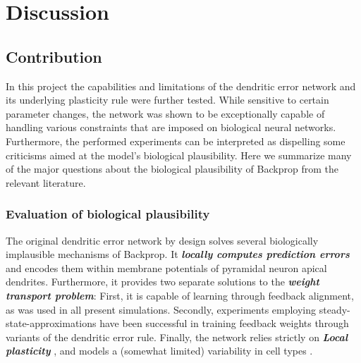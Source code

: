 
\chapter{Discussion}


\section{Contribution}

In this project the capabilities and limitations of the dendritic error network and its underlying plasticity rule were
further tested. While sensitive to certain parameter changes, the network was shown to be exceptionally capable of
handling various constraints that are imposed on biological neural networks. Furthermore, the performed experiments can
be interpreted as dispelling some criticisms aimed at the model's biological plausibility. Here we summarize many of the
major questions about the biological plausibility of Backprop from the relevant literature.


\subsection*{Evaluation of biological plausibility}

The original dendritic error network by design solves several biologically implausible mechanisms of Backprop. It
\textit{\textbf{locally computes prediction errors}} and encodes them within membrane potentials of pyramidal neuron
apical dendrites. Furthermore, it provides two separate solutions to the \textit{\textbf{weight transport problem}}:
First, it is capable of learning through feedback alignment, as was used in all present simulations. Secondly,
experiments employing steady-state-approximations have been successful in training feedback weights through variants of
the dendritic error rule. Finally, the network relies strictly on \textit{\textbf{Local plasticity}}
\citep{Whittington2017}, and models a (somewhat limited) variability in cell types \citep{Bartunov2018}.\newline

